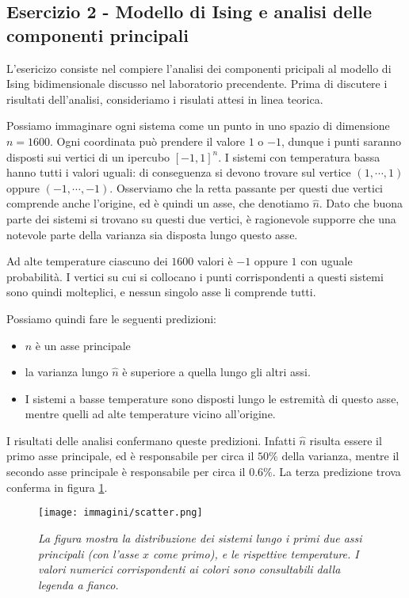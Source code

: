 \documentclass{article}
\begin{document}
\subsection*{Esercizio 2 - Modello di Ising e analisi delle componenti principali}
L'esericizo consiste nel compiere l'analisi dei componenti pricipali al modello di Ising bidimensionale discusso nel laboratorio precendente.
Prima di discutere i risultati dell'analisi, consideriamo i risulati attesi in linea teorica.

Possiamo immaginare ogni sistema come un punto in uno spazio di dimensione $n = 1600$.
Ogni coordinata può prendere il valore $1$ o $-1$, dunque i punti saranno disposti sui vertici di un ipercubo $[-1,1]^n$.
I sistemi con temperatura bassa hanno tutti i valori uguali: di conseguenza si devono trovare sul vertice $(1,\cdots, 1)$ oppure $(-1,\cdots, -1)$.
Osserviamo che la retta passante per questi due vertici comprende anche l'origine, ed è quindi un asse, che denotiamo $\hat{n}$.
Dato che buona parte dei sistemi si trovano su questi due vertici, è ragionevole supporre che una notevole parte della varianza sia disposta lungo questo asse.

Ad alte temperature ciascuno dei $1600$ valori è $-1$ oppure $1$ con uguale probabilità.
I vertici su cui si collocano i punti corrispondenti a questi sistemi sono quindi molteplici, e nessun singolo asse li comprende tutti.
 

Possiamo quindi fare le seguenti predizioni:
\begin{itemize}
    \item $\hat{n}$ è un asse principale
    \item la varianza lungo $\hat{n}$ è superiore a quella lungo gli altri assi.
    \item I sistemi a basse temperature sono disposti lungo le estremità di questo asse,
    mentre quelli ad alte temperature vicino all'origine.
\end{itemize}

I risultati delle analisi confermano queste predizioni. Infatti $\hat{n}$ risulta essere il primo asse principale, ed è responsabile per circa il $50\%$ della varianza, mentre il secondo asse principale è responsabile per circa il $ 0.6\%$.
La terza predizione trova conferma in figura \ref{fig:scatter}.


\begin{figure}[htpb]
    \centering
    \texttt{[image: immagini/scatter.png]}
    \caption{\emph{La figura mostra la distribuzione dei sistemi lungo i primi due assi principali (con l'asse $x$ come primo), e le rispettive temperature. I valori numerici corrispondenti ai colori sono consultabili dalla legenda a fianco.}}
    \label{fig:scatter}
\end{figure}
\end{document}
